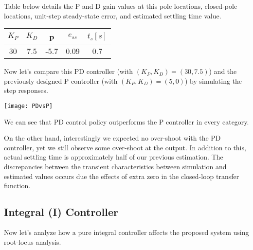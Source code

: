 \documentclass[twoside]{article}
\begin{document}
Table below details the P and D gain values at this pole locations, 
closed-pole locations,  unit-step steady-state error, and estimated
settling time value. 

\vspace{6pt}
\begin{minipage}[h]{1\linewidth}
\begin{center}
\begin{tabular}{|c | c | c | c | c  |}
\hline
$K_P$ &$K_D$ & p & $e_{ss}$ & $t_s [s]$ 
\\ \hline
30 & 7.5& -5.7 & 0.09 & 0.7
\\ \hline
\end{tabular}
\end{center}
\end{minipage}
\vspace{6pt}

Now let's compare this PD controller (with $(K_P,K_D) = (30,7.5)$)
and the previously designed P controller (with $(K_P,K_D) = (5,0)$)
by simulating the step responses. 

\vspace{12 pt}

  \begin{minipage}[h]{1\linewidth}
    \begin{center}
      \texttt{[image: PDvsP]}
    \end{center}
  \end{minipage}

\vspace{12 pt}

We can see that PD control policy outperforms 
the P controller in every category. 

On the other hand, interestingly we expected no over-shoot with
the PD controller, yet we still observe some over-shoot 
at the output. In addition to this, actual settling 
time is approximately half of our previous estimation. 
The discrepancies between the transient characteristics between
simulation and estimated values occurs due the
effects of extra zero in the closed-loop transfer function. 

\subsection{Integral (I) Controller}

Now let's analyze how a pure integral controller affects 
the proposed system using root-locus analysis. 
\end{document}
